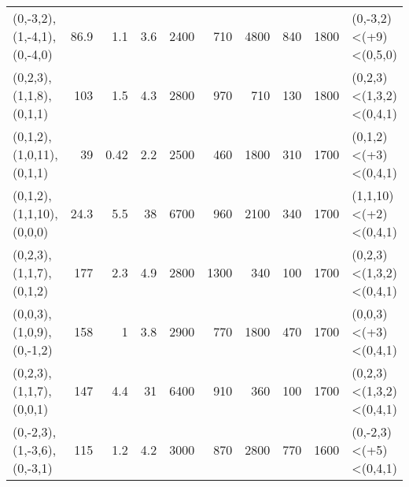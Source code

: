 \begin{tabular}{lrrrrrrrrl}
 (0,-3,2),(1,-4,1),(0,-4,0)  &       86.9 &                              1.1  &                            3.6  &                              2400 &                             710 &                              4800 &                             840 &       1800 & (0,-3,2)<(+9)<(0,5,0)   \\
 (0,2,3),(1,1,8),(0,1,1)     &      103   &                              1.5  &                            4.3  &                              2800 &                             970 &                               710 &                             130 &       1800 & (0,2,3)<(1,3,2)<(0,4,1) \\
 (0,1,2),(1,0,11),(0,1,1)    &       39   &                              0.42 &                            2.2  &                              2500 &                             460 &                              1800 &                             310 &       1700 & (0,1,2)<(+3)<(0,4,1)    \\
 (0,1,2),(1,1,10),(0,0,0)    &       24.3 &                              5.5  &                           38    &                              6700 &                             960 &                              2100 &                             340 &       1700 & (1,1,10)<(+2)<(0,4,1)   \\
 (0,2,3),(1,1,7),(0,1,2)     &      177   &                              2.3  &                            4.9  &                              2800 &                            1300 &                               340 &                             100 &       1700 & (0,2,3)<(1,3,2)<(0,4,1) \\
 (0,0,3),(1,0,9),(0,-1,2)    &      158   &                              1    &                            3.8  &                              2900 &                             770 &                              1800 &                             470 &       1700 & (0,0,3)<(+3)<(0,4,1)    \\
 (0,2,3),(1,1,7),(0,0,1)     &      147   &                              4.4  &                           31    &                              6400 &                             910 &                               360 &                             100 &       1700 & (0,2,3)<(1,3,2)<(0,4,1) \\
 (0,-2,3),(1,-3,6),(0,-3,1)  &      115   &                              1.2  &                            4.2  &                              3000 &                             870 &                              2800 &                             770 &       1600 & (0,-2,3)<(+5)<(0,4,1)   \\

\end{tabular}
